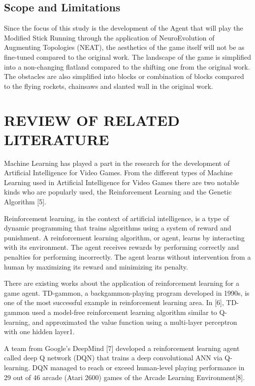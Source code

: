 \documentclass[journal]{IEEEtran}
\begin{document}
\IEEEpubidadjcol

\subsection{Scope and Limitations}

Since the focus of this study is the development of the Agent that will play the Modified Stick Running through the application of NeuroEvolution of Augmenting Topologies (NEAT), the aesthetics of the game itself will not be as fine-tuned compared to the original work. The landscape of the game is simplified into a non-changing flatland compared to the shifting one from the original work. The obstacles are also simplified into blocks or combination of blocks compared to the flying rockets, chainsaws and slanted wall in the original work.

\IEEEpubidadjcol

\section{REVIEW OF RELATED LITERATURE}

Machine Learning has played a part in the research for the development of Artificial Intelligence for Video Games. From the different types of Machine Learning used in Artificial Intelligence for Video Games there are two notable kinds who are popularly used, the Reinforcement Learning and the Genetic Algorithm [5].

Reinforcement learning, in the context of artificial intelligence, is a type of dynamic programming that trains algorithms using a system of reward and punishment. A reinforcement learning algorithm, or agent, learns by interacting with its environment. The agent receives rewards by performing correctly and penalties for performing incorrectly. The agent learns without intervention from a human by maximizing its reward and minimizing its penalty.

There are existing works about the application of reinforcement learning for a game agent. TD-gammon, a backgammon-playing program developed in 1990s, is one of the most successful example in reinforcement learning area. In [6], TD-gammon used a model-free reinforcement learning algorithm similar to Q-learning, and approximated the value function using a multi-layer perceptron with one hidden layer1. 

A team from Google’s DeepMind [7] developed a reinforcement learning
agent called deep Q network (DQN) that trains a deep convolutional ANN via
Q-learning. DQN managed to reach or exceed human-level playing performance in
29 out of 46 arcade (Atari 2600) games of the Arcade Learning Environment[8].
\end{document}
